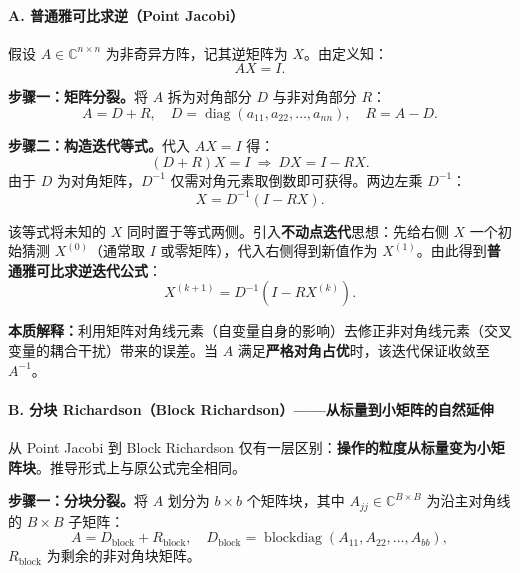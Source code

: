 \documentclass{CjC}
\begin{document}
    \paragraph{A. 普通雅可比求逆（Point Jacobi）}

    假设 $A \in \mathbb{C}^{n \times n}$ 为非奇异方阵，记其逆矩阵为 $X$。由定义知：
    \begin{equation}
        AX = I.
    \end{equation}

    \textbf{步骤一：矩阵分裂。}将 $A$ 拆为对角部分 $D$ 与非对角部分 $R$：
    \begin{equation}
        A = D + R,\quad D = \operatorname{diag}(a_{11}, a_{22}, \dots, a_{nn}),\quad
        R = A - D.
    \end{equation}

    \textbf{步骤二：构造迭代等式。}代入 $AX = I$ 得：
    \begin{equation}
        (D + R)X = I \ \Longrightarrow\ DX = I - RX.
    \end{equation}
    由于 $D$ 为对角矩阵，$D^{-1}$ 仅需对角元素取倒数即可获得。两边左乘 $D^{-1}$：
    \begin{equation}
        X = D^{-1}(I - RX).
    \end{equation}

    该等式将未知的 $X$ 同时置于等式两侧。引入\textbf{不动点迭代}思想：先给右侧 $X$
    一个初始猜测 $X^{(0)}$（通常取 $I$ 或零矩阵），代入右侧得到新值作为
    $X^{(1)}$。由此得到\textbf{普通雅可比求逆迭代公式}：
    \begin{equation}
        \boxed{X^{(k+1)} = D^{-1}(I - RX^{(k)})}.
    \end{equation}

    \textbf{本质解释：}利用矩阵对角线元素（自变量自身的影响）去修正非对角线元素（交叉变量的耦合干扰）带来的误差。当
    $A$ 满足\textbf{严格对角占优}时，该迭代保证收敛至 $A^{-1}$。

    \paragraph{B. 分块 Richardson（Block Richardson）——从标量到小矩阵的自然延伸}

    从 Point Jacobi 到 Block Richardson 仅有一层区别：\textbf{操作的粒度从标量变为小矩阵块}。推导形式上与原公式完全相同。

    \textbf{步骤一：分块分裂。}将 $A$ 划分为 $b \times b$ 个矩阵块，其中
    $A_{jj}\in \mathbb{C}^{B \times B}$ 为沿主对角线的 $B \times B$ 子矩阵：
    \begin{equation}
        A = D_{\text{block}}+ R_{\text{block}},\quad D_{\text{block}}= \operatorname{blockdiag}
        (A_{11}, A_{22}, \dots, A_{bb}),
    \end{equation}
    $R_{\text{block}}$ 为剩余的非对角块矩阵。
\end{document}
